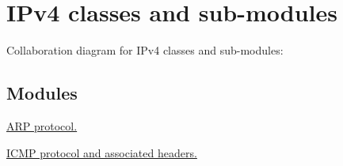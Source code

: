 \hypertarget{group__ipv4}{}\section{I\+Pv4 classes and sub-\/modules}
\label{group__ipv4}
Collaboration diagram for I\+Pv4 classes and sub-\/modules\+:
\subsection*{Modules}
\begin{DoxyCompactItemize}
\item 
\hyperlink{group__arp}{A\+R\+P protocol.}
\item 
\hyperlink{group__icmp}{I\+C\+M\+P protocol and associated headers.}
\end{DoxyCompactItemize}
